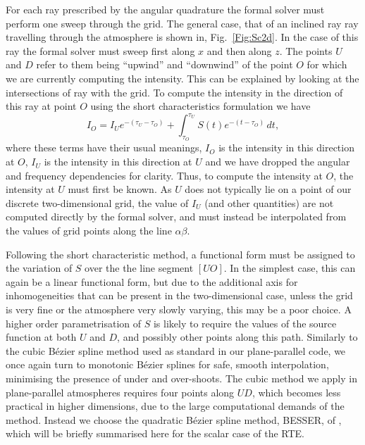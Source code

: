 For each ray prescribed by the angular quadrature the formal solver must perform one sweep through the grid.
The general case, that of an inclined ray ray travelling through the atmosphere is shown in, Fig.~\ref{Fig:Sc2d}.
In the case of this ray the formal solver must sweep first along $x$ and then along $z$.
The points $U$ and $D$ refer to them being ``upwind'' and ``downwind'' of the point $O$ for which we are currently computing the intensity.
This can be explained by looking at the intersections of ray with the grid.
To compute the intensity in the direction of this ray at point $O$ using the short characteristics formulation we have
\begin{equation}\label{Eq:MiniScDefinition}
   I_O = I_U e^{-(\tau_U - \tau_O)} + \int_{\tau_O}^{\tau_U} S(t) e^{-(t - \tau_O)}\, dt,
\end{equation}
where these terms have their usual meanings, $I_O$ is the intensity in this direction at $O$, $I_U$ is the intensity in this direction at $U$ and we have dropped the angular and frequency dependencies for clarity.
Thus, to compute the intensity at $O$, the intensity at $U$ must first be known.
As $U$ does not typically lie on a point of our discrete two-dimensional grid, the value of $I_U$ (and other quantities) are not computed directly by the formal solver, and must instead be interpolated from the values of grid points along the line $\alpha\beta$.

Following the short characteristic method, a functional form must be assigned to the variation of $S$ over the the line segment $[UO]$.
In the simplest case, this can again be a linear functional form, but due to the additional axis for inhomogeneities that can be present in the two-dimensional case, unless the grid is very fine or the atmosphere very slowly varying, this may be a poor choice.
A higher order parametrisation of $S$ is likely to require the values of the source function at both $U$ and $D$, and possibly other points along this path.
Similarly to the cubic Bézier spline method used as standard in our plane-parallel code, we once again turn to monotonic Bézier splines for safe, smooth interpolation, minimising the presence of under and over-shoots.
The cubic method we apply in plane-parallel atmospheres requires four points along $UD$, which becomes less practical in higher dimensions, due to the large computational demands of the method.
Instead we choose the quadratic Bézier spline method, BESSER, of \citet{Stepan2013}, which will be briefly summarised here for the scalar case of the RTE.

